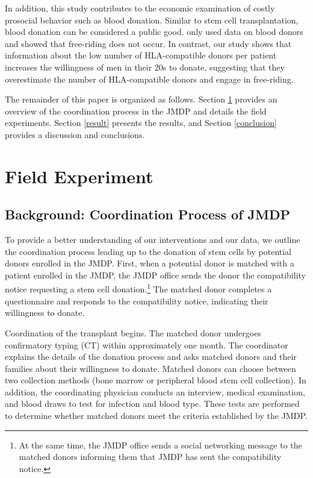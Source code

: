 \documentclass[12pt, a4paper]{article}
\begin{document}
In addition, this study contributes to the economic examination of costly prosocial behavior such as blood donation. Similar to stem cell transplantation, blood donation can be considered a public good. \citet{Wildman2009} only used data on blood donors and showed that free-riding does not occur. In contrast, our study shows that information about the low number of HLA-compatible donors per patient increases the willingness of men in their 20s to donate, suggesting that they overestimate the number of HLA-compatible donors and engage in free-riding.

The remainder of this paper is organized as follows. Section \ref{experiment} provides an overview of the coordination process in the JMDP and details the field experiments. Section \ref{result} presents the results, and Section \ref{conclusion} provides a discussion and conclusions.

\hypertarget{experiment}{%
\section{Field Experiment}\label{experiment}}

\hypertarget{background}{%
\subsection{Background: Coordination Process of JMDP}\label{background}}

To provide a better understanding of our interventions and our data, we outline the coordination process leading up to the donation of stem cells by potential donors enrolled in the JMDP. First, when a potential donor is matched with a patient enrolled in the JMDP, the JMDP office sends the donor the compatibility notice requesting a stem cell donation.\footnote{At the same time, the JMDP office sends a social networking message to the matched donors informing them that JMDP has sent the compatibility notice.} The matched donor completes a questionnaire and responds to the compatibility notice, indicating their willingness to donate.

Coordination of the transplant begins. The matched donor undergoes confirmatory typing (CT) within approximately one month. The coordinator explains the details of the donation process and asks matched donors and their families about their willingness to donate. Matched donors can choose between two collection methods (bone marrow or peripheral blood stem cell collection). In addition, the coordinating physician conducts an interview, medical examination, and blood draws to test for infection and blood type. These tests are performed to determine whether matched donors meet the criteria established by the JMDP.
\end{document}

